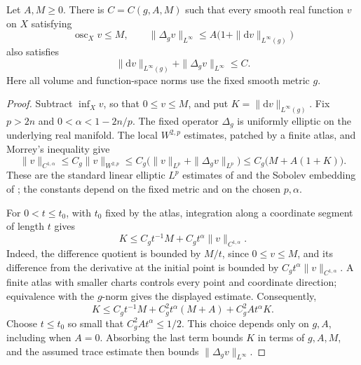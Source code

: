\begin{lemma}\label{lem:fixed-trace-gradient-interpolation}
Let $A,M\geq0$. There is $C=C(g,A,M)$ such that every smooth real function $v$ on $X$ satisfying
\[
 \operatorname{osc}_Xv\leq M,\qquad
 \|\Delta_gv\|_{L^\infty}
       \leq A\bigl(1+\|\mathrm{d}v\|_{L^\infty(g)}\bigr)
\]
also satisfies
\[
 \|\mathrm{d}v\|_{L^\infty(g)}+\|\Delta_gv\|_{L^\infty}\leq C.
\]
Here all volume and function-space norms use the fixed smooth metric $g$.
\end{lemma}
\begin{proof}
Subtract $\inf_Xv$, so that $0\leq v\leq M$, and put $K=\|\mathrm{d}v\|_{L^\infty(g)}$. Fix $p>2n$ and $0<\alpha<1-2n/p$. The fixed operator $\Delta_g$ is uniformly elliptic on the underlying real manifold. The local $W^{2,p}$ estimates, patched by a finite atlas, and Morrey's inequality give
\[
 \|v\|_{C^{1,\alpha}}
 \leq C_g\|v\|_{W^{2,p}}
 \leq C_g\bigl(\|v\|_{L^p}+\|\Delta_gv\|_{L^p}\bigr)
 \leq C_g\bigl(M+A(1+K)\bigr).
\]
These are the standard linear elliptic $L^p$ estimates of \cite[Chapter~9]{GT01} and the Sobolev embedding of \cite[Chapter~7]{GT01}; the constants depend on the fixed metric and on the chosen $p,\alpha$.

For $0<t\leq t_0$, with $t_0$ fixed by the atlas, integration along a coordinate segment of length $t$ gives
\[
 K\leq C_g t^{-1}M+C_g t^\alpha\|v\|_{C^{1,\alpha}}.
\]
Indeed, the difference quotient is bounded by $M/t$, since $0\leq v\leq M$, and its difference from the derivative at the initial point is bounded by $C_gt^\alpha\|v\|_{C^{1,\alpha}}$. A finite atlas with smaller charts controls every point and coordinate direction; equivalence with the $g$-norm gives the displayed estimate. Consequently,
\[
 K\leq C_gt^{-1}M+C_g^2t^\alpha(M+A)
                      +C_g^2At^\alpha K.
\]
Choose $t\leq t_0$ so small that $C_g^2At^\alpha\leq1/2$. This choice depends only on $g,A$, including when $A=0$. Absorbing the last term bounds $K$ in terms of $g,A,M$, and the assumed trace estimate then bounds $\|\Delta_gv\|_{L^\infty}$.
\end{proof}
